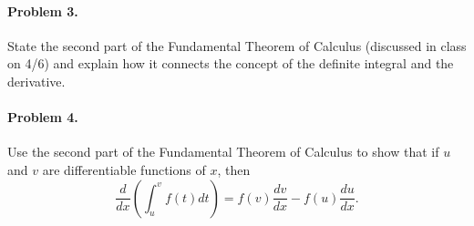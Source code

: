 \documentclass{article}
\begin{document}
\paragraph*{Problem 3.} State the second part of the Fundamental Theorem of Calculus (discussed in class on 4/6) and explain how it connects the concept of the definite integral and the derivative. 

\paragraph*{Problem 4.} Use the second part of the Fundamental Theorem of Calculus to show that if $u$ and $v$ are differentiable functions of $x$, then
\[
\frac{d}{dx}\left(\int_{u}^{v}f(t)dt\right)=f(v)\frac{dv}{dx}-f(u)\frac{du}{dx}.
\]
\end{document}
